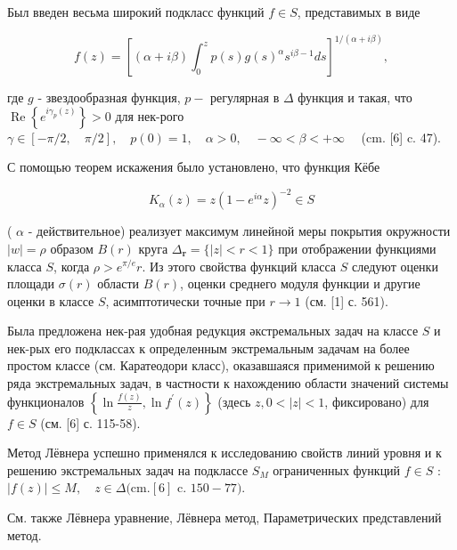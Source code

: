 \documentclass[10pt]{article}
\begin{document}
Был введен весьма широкий подкласс функций $f \in S$, представимых в виде



\[

f(z)=\left[(\alpha+i \beta) \int_{0}^{z} p(s) g(s)^{\alpha} s^{i \beta-1} d s\right]^{1 /(\alpha+i \beta)},

\]



где $g$ - звездообразная функция, $p-$ регулярная в $\Delta$ функция и такая, что $\operatorname{Re}\left\{e^{i \gamma_{p}(z)}\right\}>0$ для нек-рого $\gamma \in[-\pi / 2, \quad \pi / 2], \quad p(0)=1, \quad \alpha>0, \quad-\infty<\beta<+\infty \quad$ (cm. [6] c. 47).



С помощью теорем искажения было установлено, что функция Кёбе



\[

K_{\alpha}(z)=z\left(1-e^{i \alpha} z\right)^{-2} \in S

\]



( $\alpha$ - действительное) реализует максимум линейной меры покрытия окружности $|w|=\rho$ образом $B(r)$ круга $\Delta_{\boldsymbol{r}}=\{|z|<r<1\}$ при отображении функциями класса $S$, когда $\rho>e^{\pi / e} r$. Из этого свойства функций класса $S$ следуют оценки площади $\sigma(r)$ области $B(r)$, оценки среднего модуля функции и другие оценки в классе $S$, асимптотически точные при $r \rightarrow 1$ (см. [1] с. 561).



Была предложена нек-рая удобная редукция әкстремальных задач на классе $S$ и нек-рых его подклассах к определенным экстремальным задачам на более простом классе (см. Каратеодори класс), оказавшаяся применимой к решению ряда экстремальных задач, в частности к нахождению области значений системы функционалов $\left\{\ln \frac{f(z)}{z}, \ln f^{\prime}(z)\right\}$ (здесь $z, 0<|z|<1$, фиксировано) для $f \in S$ (см. [6] с. 115-58).



Метод Лёвнера успешно применялся к исследованию свойств линий уровня и к решению экстремальных задач на подклассе $S_{M}$ ограниченных функций $f \in S$ : $|f(z)| \leqslant M, \quad z \in \Delta(\mathrm{cm} .[6]$ c. $150-77)$.



См. также Лёвнера уравнение, Лёвнера метод, Параметрических представлений метод.
\end{document}
